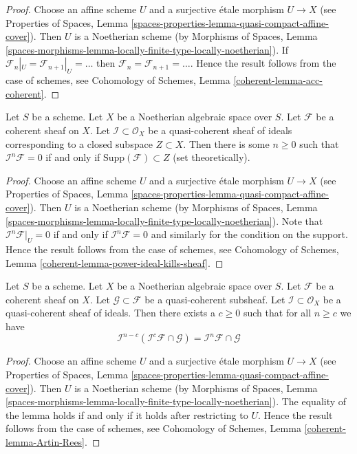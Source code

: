 \begin{proof}
Choose an affine scheme $U$ and a surjective \'etale morphism $U \to X$
(see Properties of Spaces, Lemma
\ref{spaces-properties-lemma-quasi-compact-affine-cover}).
Then $U$ is a Noetherian scheme (by
Morphisms of Spaces, Lemma
\ref{spaces-morphisms-lemma-locally-finite-type-locally-noetherian}).
If $\mathcal{F}_n|_U = \mathcal{F}_{n + 1}|_U = \ldots$
then $\mathcal{F}_n = \mathcal{F}_{n + 1} = \ldots$.
Hence the result follows from the case of schemes, see
Cohomology of Schemes, Lemma \ref{coherent-lemma-acc-coherent}.
\end{proof}

\begin{lemma}
\label{lemma-power-ideal-kills-sheaf}
Let $S$ be a scheme. Let $X$ be a Noetherian algebraic space over $S$.
Let $\mathcal{F}$ be a coherent sheaf on $X$. Let
$\mathcal{I} \subset \mathcal{O}_X$ be a quasi-coherent sheaf of ideals
corresponding to a closed subspace $Z \subset X$. Then there is some
$n \geq 0$ such that $\mathcal{I}^n\mathcal{F} = 0$ if and only if
$\text{Supp}(\mathcal{F}) \subset Z$ (set theoretically).
\end{lemma}

\begin{proof}
Choose an affine scheme $U$ and a surjective \'etale morphism $U \to X$
(see Properties of Spaces, Lemma
\ref{spaces-properties-lemma-quasi-compact-affine-cover}).
Then $U$ is a Noetherian scheme (by
Morphisms of Spaces, Lemma
\ref{spaces-morphisms-lemma-locally-finite-type-locally-noetherian}).
Note that $\mathcal{I}^n\mathcal{F}|_U = 0$ if and only if
$\mathcal{I}^n\mathcal{F} = 0$ and similarly for the condition on
the support. Hence the result follows from the case of schemes, see
Cohomology of Schemes, Lemma \ref{coherent-lemma-power-ideal-kills-sheaf}.
\end{proof}

\begin{lemma}
\label{lemma-Artin-Rees}
Let $S$ be a scheme. Let $X$ be a Noetherian algebraic space over $S$.
Let $\mathcal{F}$ be a coherent sheaf on $X$. Let
$\mathcal{G} \subset \mathcal{F}$ be a quasi-coherent subsheaf.
Let $\mathcal{I} \subset \mathcal{O}_X$ be a quasi-coherent sheaf of
ideals. Then there exists a $c \geq 0$ such that for all $n \geq c$ we
have
$$
\mathcal{I}^{n - c}(\mathcal{I}^c\mathcal{F} \cap \mathcal{G})
=
\mathcal{I}^n\mathcal{F} \cap \mathcal{G}
$$
\end{lemma}

\begin{proof}
Choose an affine scheme $U$ and a surjective \'etale morphism $U \to X$
(see Properties of Spaces, Lemma
\ref{spaces-properties-lemma-quasi-compact-affine-cover}).
Then $U$ is a Noetherian scheme (by
Morphisms of Spaces, Lemma
\ref{spaces-morphisms-lemma-locally-finite-type-locally-noetherian}).
The equality of the lemma holds if and only if it holds after
restricting to $U$. Hence the result follows from the case of schemes, see
Cohomology of Schemes, Lemma \ref{coherent-lemma-Artin-Rees}.
\end{proof}

